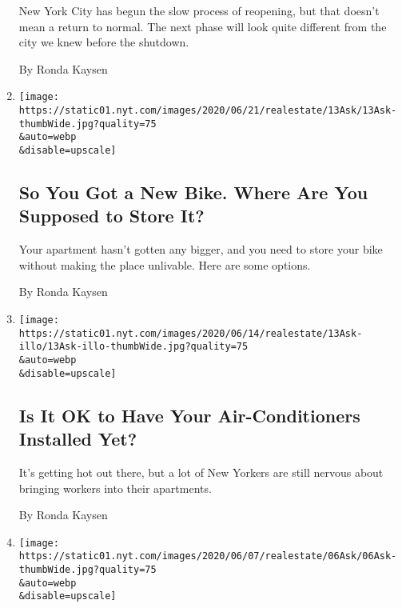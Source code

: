 \begin{enumerate}
  New York City has begun the slow process of reopening, but that
  doesn't mean a return to normal. The next phase will look quite
  different from the city we knew before the shutdown.

  By Ronda Kaysen
\item
  \href{/2020/06/20/realestate/bike-bicycle-rack-apartment-storage-coronavirus.html}{}

  \texttt{[image: https://static01.nyt.com/images/2020/06/21/realestate/13Ask/13Ask-thumbWide.jpg?quality=75\\\&auto=webp\\\&disable=upscale]}

  \hypertarget{so-you-got-a-new-bike-where-are-you-supposed-to-store-it}{%
  \subsection{So You Got a New Bike. Where Are You Supposed to Store
  It?}\label{so-you-got-a-new-bike-where-are-you-supposed-to-store-it}}

  Your apartment hasn't gotten any bigger, and you need to store your
  bike without making the place unlivable. Here are some options.

  By Ronda Kaysen
\item
  \href{/2020/06/13/realestate/is-it-safe-to-have-your-air-conditioners-installed-yet-coronavirus.html}{}

  \texttt{[image: https://static01.nyt.com/images/2020/06/14/realestate/13Ask-illo/13Ask-illo-thumbWide.jpg?quality=75\\\&auto=webp\\\&disable=upscale]}

  \hypertarget{is-it-ok-to-have-your-air-conditioners-installed-yet}{%
  \subsection{Is It OK to Have Your Air-Conditioners Installed
  Yet?}\label{is-it-ok-to-have-your-air-conditioners-installed-yet}}

  It's getting hot out there, but a lot of New Yorkers are still nervous
  about bringing workers into their apartments.

  By Ronda Kaysen
\item
  \href{/2020/06/06/realestate/can-my-dog-poop-on-someones-lawn-if-theres-no-sidewalk.html}{}

  \texttt{[image: https://static01.nyt.com/images/2020/06/07/realestate/06Ask/06Ask-thumbWide.jpg?quality=75\\\&auto=webp\\\&disable=upscale]}

  \hypertarget{can-my-dog-poop-on-someones-lawn-if-theres-no-sidewalk}{%
}
\end{enumerate}
